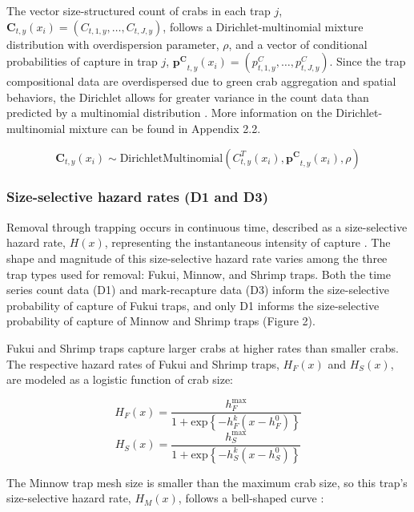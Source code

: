 \documentclass{article}
\begin{document}
The vector size-structured count of crabs in each trap $j$, $\textbf{C}_{t,y}(x_i) = (C_{t,1,y}, \ldots, C_{t, J, y})$, follows a Dirichlet-multinomial mixture distribution with overdispersion parameter, $\rho$, and a vector of conditional probabilities of capture in trap $j$, $\mathbf{p^C}_{t,y}(x_i) = (p^C_{t,1,y}, \ldots, p^C_{t, J, y})$. Since the trap compositional data are overdispersed due to green crab aggregation and spatial behaviors, the Dirichlet allows for greater variance in the count data than predicted by a multinomial distribution \parencite{thorson2017model}. More information on the Dirichlet-multinomial mixture can be found in Appendix 2.2.

\begin{equation}
\textbf{C}_{t,y}(x_i) \sim \text{DirichletMultinomial}(C^T_{t,y}(x_i), \mathbf{p^C}_{t,y}(x_i), \rho)
\end{equation}

\subsubsection*{Size-selective hazard rates (D1 and D3)}

Removal through trapping occurs in continuous time, described as a size-selective hazard rate, $H(x)$, representing the instantaneous intensity of capture \parencite{ergon2018utility}. The shape and magnitude of this size-selective hazard rate varies among the three trap types used for removal: Fukui, Minnow, and Shrimp traps. Both the time series count data (D1) and mark-recapture data (D3) inform the size-selective probability of capture of Fukui traps, and only D1 informs the size-selective probability of capture of Minnow and Shrimp traps (Figure 2). 

Fukui and Shrimp traps capture larger crabs at higher rates than smaller crabs. The respective hazard rates of Fukui and Shrimp traps, $H_F(x)$ and $H_S(x)$, are modeled as a logistic function of crab size:

\begin{equation}
H_F(x) = \frac{h^{\text{max}}_F}{1+\text{exp}\left\{-h^k_F(x-h^0_F)\right\}}
\end{equation}
\begin{equation}
H_S(x) = \frac{h^{\text{max}}_S}{1+\text{exp}\left\{-h^k_S(x-h^0_S)\right\}}
\end{equation}

The Minnow trap mesh size is smaller than the maximum crab size, so this trap's size-selective hazard rate, $H_M(x)$, follows a bell-shaped curve \parencite{jorgensen2009size}:
\end{document}
